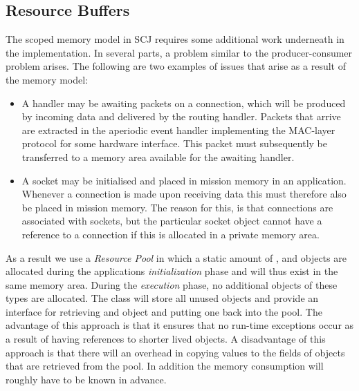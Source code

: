 \subsection{Resource Buffers}
The scoped memory model in SCJ requires some additional work underneath in the implementation. In several parts, a problem similar to the producer-consumer problem arises. The following are two examples of issues that arise as a result of the memory model:
\begin{itemize}
	\item A handler may be awaiting packets on a connection, which will be produced by incoming data and delivered by the routing handler. Packets that arrive are extracted in the aperiodic event handler implementing the MAC-layer protocol for some hardware interface. This packet must subsequently be transferred to a memory area available for the awaiting handler.
	\item A socket may be initialised and placed in mission memory in an application. Whenever a connection is made upon receiving data this must therefore also be placed in mission memory. The reason for this, is that connections are associated with sockets, but the particular socket object cannot have a reference to a connection if this is allocated in a private memory area.
\end{itemize}

As a result we use a \textit{Resource Pool}\cite{Rios:2012:PSJ:2388936.2388938} in which a static amount of ,  and  objects are allocated during the applications \textit{initialization} phase and will thus exist in the same memory area. During the \textit{execution} phase, no additional objects of these types are allocated. The class  will store all unused objects and provide an interface for retrieving and object and putting one back into the pool. The advantage of this approach is that it ensures that no run-time exceptions occur as a result of having references to shorter lived objects. A disadvantage of this approach is that there will an overhead in copying values to the fields of objects that are retrieved from the pool. In addition the memory consumption will roughly have to be known in advance.